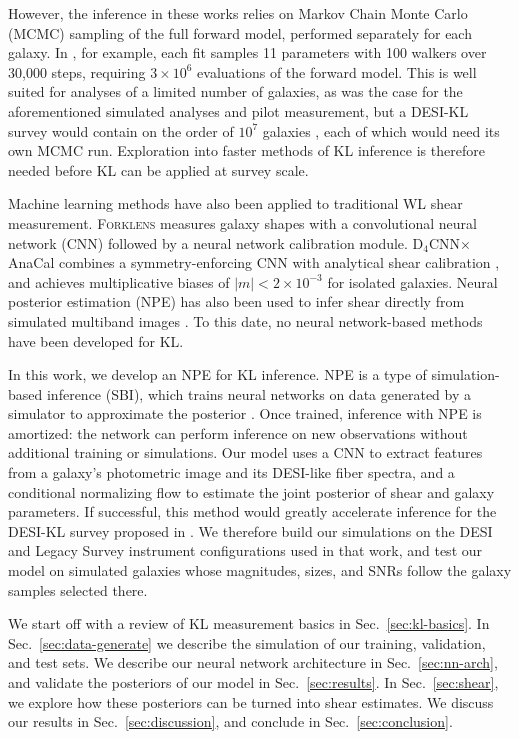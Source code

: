 However, the inference in these works relies on Markov Chain Monte Carlo (MCMC) sampling of the full forward model, performed separately for each galaxy. In \citep{KLInferenceI}, for example, each fit samples 11 parameters with 100 walkers over 30,000 steps, requiring $3\times10^6$ evaluations of the forward model. This is well suited for analyses of a limited number of galaxies, as was the case for the aforementioned simulated analyses and pilot measurement, but a DESI-KL survey would contain on the order of $10^7$ galaxies \citep{KLDESI}, each of which would need its own MCMC run.  Exploration into faster methods of KL inference is therefore needed before KL can be applied at survey scale.

Machine learning methods have also been applied to traditional WL shear measurement. \textsc{Forklens} \citep{Forklens} measures galaxy shapes with a convolutional neural network (CNN) followed by a neural network calibration module. D$_4$CNN$\times$AnaCal \citep{D4CNN} combines a symmetry-enforcing CNN with analytical shear calibration \citep{Anacal}, and achieves multiplicative biases of $|m|<2\times10^{-3}$ for isolated galaxies. Neural posterior estimation (NPE) has also been used to infer shear directly from simulated multiband images \citep{NPEShear}. To this date, no neural network-based methods have been developed for KL.

In this work, we develop an NPE for KL inference. NPE is a type of simulation-based inference (SBI), which trains neural networks on data generated by a simulator to approximate the posterior \citep{SBIGuide}. Once trained, inference with NPE is amortized: the network can perform inference on new observations without additional training or simulations. Our model uses a CNN to extract features from a galaxy's photometric image and its DESI-like fiber spectra, and a conditional normalizing flow to estimate the joint posterior of shear and galaxy parameters. If successful, this method would greatly accelerate inference for the DESI-KL survey proposed in \citep{KLDESI}. We therefore build our simulations on the DESI and Legacy Survey instrument configurations used in that work, and test our model on simulated galaxies whose magnitudes, sizes, and SNRs follow the galaxy samples selected there.

We start off with a review of KL measurement basics in Sec.~\ref{sec:kl-basics}. In Sec.~\ref{sec:data-generate} we describe the simulation of our training, validation, and test sets. We describe our neural network architecture in Sec.~\ref{sec:nn-arch}, and validate the posteriors of our model in Sec.~\ref{sec:results}. In Sec.~\ref{sec:shear}, we explore how these posteriors can be turned into shear estimates. We discuss our results in Sec.~\ref{sec:discussion}, and conclude in Sec.~\ref{sec:conclusion}.
